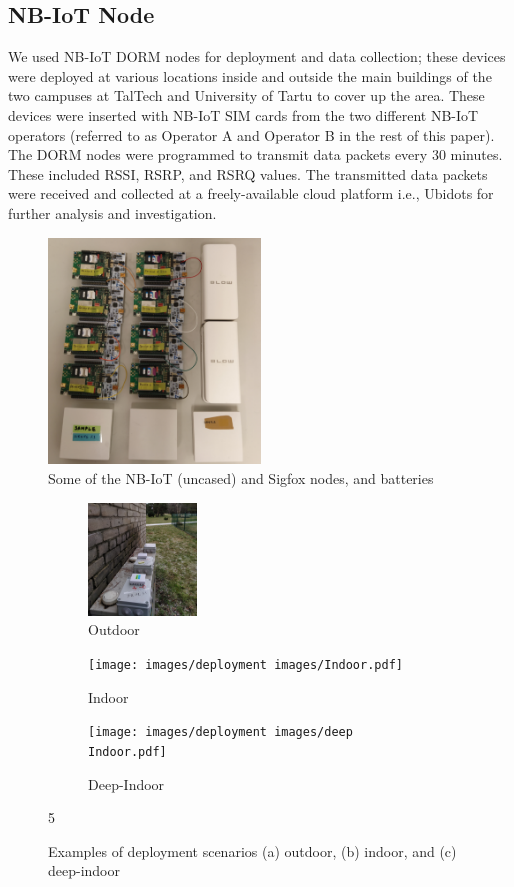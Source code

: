\documentclass[conference,a4paper,xcolor=table]{IEEEtran}
\begin{document}
\subsection{NB-IoT Node}
We used NB-IoT DORM nodes \cite{khan2019dorm} for deployment and data collection; these devices were deployed at various locations inside and outside the main buildings of the two campuses at TalTech and University of Tartu to cover up the area. These devices were inserted with NB-IoT SIM cards from the two different NB-IoT operators (referred to as Operator A and Operator B in the rest of this paper). The DORM nodes were programmed to transmit data packets every 30 minutes. These included RSSI, RSRP, and RSRQ  values. The transmitted data packets were received and collected at a freely-available cloud platform i.e., Ubidots\cite{ubidots} for further analysis and investigation.
\begin{figure}[h!]
\centering
    \includegraphics[width=0.8\columnwidth,height=6cm, keepaspectratio]{images/deployment images/experiment setup.pdf}
    \caption{Some of the NB-IoT (uncased) and Sigfox nodes, and batteries}
    \label{devices}
\end{figure}

\begin{figure}[h]
\centering
\begin{subfigure}[t]{0.3\linewidth}
  \centering
  \includegraphics[width=\linewidth,origin=c,height=3cm]{images/deployment images/Outdoor.pdf}  
  \caption{Outdoor}
\end{subfigure}
\begin{subfigure}[t]{0.3\linewidth}
  \centering
  \texttt{[image: images/deployment images/Indoor.pdf]}  
  \caption{Indoor}
\end{subfigure}
\begin{subfigure}[t]{0.3\linewidth}
  \centering
  \texttt{[image: images/deployment images/deep Indoor.pdf]}  
\caption{Deep-Indoor}
 \end{subfigure}
5\caption{Examples of deployment scenarios (a) outdoor, (b) indoor, and (c) deep-indoor}
 \label{Deployment}
\end{figure}
\end{document}
